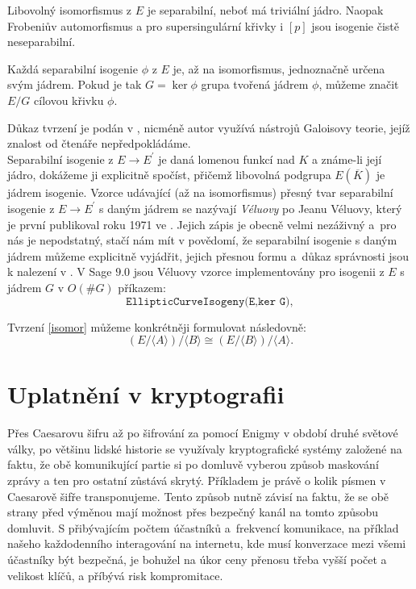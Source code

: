 \documentclass [12pt]{report}
\begin{document}
Libovolný isomorfismus z $E$ je separabilní, neboť má triviální jádro. Naopak Frobeniův automorfismus a pro supersingulární křivky i $[p]$ jsou isogenie čistě neseparabilní.

\begin{veta}\label{isomor}
Každá separabilní isogenie $\phi$ z $E$ je, až na isomorfismus, jednoznačně určena svým jádrem. Pokud je tak $G = \ker \phi$ grupa tvořená jádrem $\phi$, můžeme značit $E/G$ cílovou křivku $\phi$. 
\end{veta}
Důkaz tvrzení je podán v \cite[Prop. 12.12]{Washington}, nicméně autor využívá nástrojů Galoisovy teorie, jejíž znalost od čtenáře nepředpokládáme.\\

Separabilní isogenie z $E \longrightarrow E^\prime$ je daná lomenou funkcí nad $K$ a známe-li její jádro, dokážeme ji explicitně spočíst, přičemž libovolná podgrupa $E(\overline{K})$ je jádrem isogenie. Vzorce udávající (až na isomorfismus) přesný tvar separabilní isogenie z $E \longrightarrow E^\prime$ s daným jádrem se nazývají \textit{Véluovy} po Jeanu Véluovy, který je první publikoval roku 1971 ve \cite{Velu}. Jejich zápis je obecně velmi nezáživný a~pro nás je nepodstatný, stačí nám mít v povědomí, že separabilní isogenie s daným jádrem můžeme explicitně vyjádřit, jejich přesnou formu a~důkaz správnosti jsou k nalezení v \cite[Ch.~8.2]{DeFeo}. V Sage $9.0$ jsou Véluovy vzorce implementovány pro isogenii z $E$ s jádrem $G$ v $O(\# G)$ příkazem:
\begin{equation*}
\texttt{EllipticCurveIsogeny(E,ker G)},
\end{equation*}

Tvrzení \ref{isomor} můžeme konkrétněji formulovat následovně:
\begin{equation*}
(E/ \langle A \rangle)/ \langle B \rangle \cong (E/ \langle B \rangle)/ \langle A \rangle.
\end{equation*}





\chapter{Uplatnění v kryptografii}

Přes Caesarovu šifru až po šifrování za pomocí Enigmy v období druhé světové války, po většinu lidské historie se využívaly kryptografické systémy založené na faktu, že obě komunikující partie si po domluvě vyberou způsob maskování zprávy a ten pro ostatní zůstává skrytý. Příkladem je právě o kolik písmen v Caesarově šifře transponujeme. Tento způsob nutně závisí na faktu, že se obě strany před výměnou mají možnost přes bezpečný kanál na tomto způsobu domluvit. S přibývajícím počtem účastníků a~frekvencí komunikace, na příklad našeho každodenního interagování na internetu, kde musí konverzace mezi všemi účastníky být bezpečná, je bohužel na úkor ceny přenosu třeba vyšší počet a velikost klíčů, a příbývá risk kompromitace.\\
\end{document}
